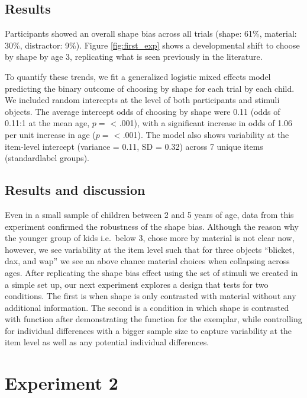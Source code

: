 \documentclass[10pt, letterpaper]{article}
\begin{document}
\subsection{Results}\label{results}

Participants showed an overall shape bias across all trials (shape:
61\%, material: 30\%, distractor: 9\%). Figure \ref{fig:first_exp} shows
a developmental shift to choose by shape by age 3, replicating what is
seen previously in the literature.

To quantify these trends, we fit a generalized logistic mixed effects
model predicting the binary outcome of choosing by shape for each trial
by each child. We included random intercepts at the level of both
participants and stimuli objects. The average intercept odds of choosing
by shape were 0.11 (odds of 0.11:1 at the mean age, \(p=\) \textless{}
.001), with a significant increase in odds of 1.06 per unit increase in
age (\(p=\) \textless{} .001). The model also shows variability at the
item-level intercept (variance = 0.11, SD = 0.32) across 7 unique items
(standardlabel groups).

\subsection{Results and discussion}\label{results-and-discussion}

Even in a small sample of children between 2 and 5 years of age, data
from this experiment confirmed the robustness of the shape bias.
Although the reason why the younger group of kids i.e.~below 3, chose
more by material is not clear now, however, we see variability at the
item level such that for three objects ``blicket, dax, and wap'' we see
an above chance material choices when collapsing across ages. After
replicating the shape bias effect using the set of stimuli we created in
a simple set up, our next experiment explores a design that tests for
two conditions. The first is when shape is only contrasted with material
without any additional information. The second is a condition in which
shape is contrasted with function after demonstrating the function for
the exemplar, while controlling for individual differences with a bigger
sample size to capture variability at the item level as well as any
potential individual differences.

\section{Experiment 2}\label{experiment-2}
\end{document}
